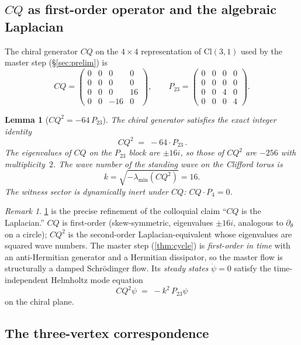 \documentclass[11pt,a4paper]{article}
\theoremstyle{plain}
\newtheorem{lemma}[theorem]{Lemma}
\theoremstyle{definition}
\theoremstyle{remark}
\newtheorem{remark}[theorem]{Remark}
\numberwithin{equation}{section}
\providecommand{\Cl}{\mathrm{Cl}}
\begin{document}
\subsection{$CQ$ as first-order operator and the algebraic Laplacian}
\label{ssec:cq-squared}

The chiral generator $CQ$ on the $4\times 4$ representation of
$\Cl(3,1)$ used by the master step (\S\ref{sec:prelim}) is
\[
CQ = \begin{pmatrix} 0 & 0 & 0 & 0 \\ 0 & 0 & 0 & 0 \\ 0 & 0 & 0 & 16 \\ 0 & 0 & -16 & 0 \end{pmatrix},
\qquad P_{23} = \begin{pmatrix} 0 & 0 & 0 & 0 \\ 0 & 0 & 0 & 0 \\ 0 & 0 & 4 & 0 \\ 0 & 0 & 0 & 4 \end{pmatrix}.
\]

\begin{lemma}[$CQ^2 = -64\, P_{23}$]
\label{lem:cq-squared}
The chiral generator satisfies the exact integer identity
\[
\boxed{\, CQ^2 \;=\; -64 \cdot P_{23} \,}.
\]
The eigenvalues of $CQ$ on the $P_{23}$ block are $\pm 16i$, so
those of $CQ^2$ are $-256$ with multiplicity~$2$. The
\emph{wave number} of the standing wave on the Clifford torus is
\[
k = \sqrt{-\lambda_{\min}(CQ^2)} = 16.
\]
The witness sector is dynamically inert under $CQ$: $CQ \cdot P_4 = 0$.
\end{lemma}

\begin{remark}
\cref{lem:cq-squared} is the precise refinement of the colloquial
claim ``$CQ$ is the Laplacian.'' $CQ$ is first-order
(skew-symmetric, eigenvalues $\pm 16i$, analogous to
$\partial_\theta$ on a circle); $CQ^2$ is the second-order
Laplacian-equivalent whose eigenvalues are squared wave numbers.
The master step (\cref{thm:cycle}) is \emph{first-order in time}
with an anti-Hermitian generator and a Hermitian dissipator, so the
master flow is structurally a damped Schr\"odinger flow. Its
\emph{steady states} $\dot\psi = 0$ satisfy the time-independent
Helmholtz mode equation
\[
CQ^2 \psi \;=\; -k^2\, P_{23} \psi
\]
on the chiral plane.
\end{remark}

\subsection{The three-vertex correspondence}
\label{ssec:three-vertex}
\end{document}
